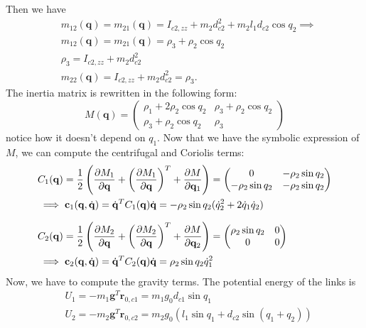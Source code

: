\documentclass[10pt, a4paper]{report}
\newcommand{\q}{{\mathbf q}}
\begin{document}
Then we have\begin{align}
    &m_{12}(\q)=m_{21}(\q)=I_{c2,zz} + m_2 d_{c2}^2 + m_2 l_1 d_{c2} \cos q_2\implies \\
    &m_{12}(\q)=m_{21}(\q)=\rho_3+\rho_2\cos q_2\\
    &\rho_3=I_{c2,zz} + m_2 d_{c2}^2\\
    &m_{22}(\q)=I_{c2,zz} + m_2 d_{c2}^2=\rho_3.
\end{align}
The inertia matrix is rewritten in the following form:\begin{equation}
    M(\q)=\begin{pmatrix}
        \rho_1 + 2\rho_2 \cos q_2&\rho_3+\rho_2\cos q_2\\ 
        \rho_3+\rho_2\cos q_2&\rho_3
    \end{pmatrix}
\end{equation}
notice how it doesn't depend on $q_1$. Now that we have the symbolic expression of $M$, we can compute the centrifugal and Coriolis terms:\begin{align}
    &C_1(\q)=\frac{1}{2}\left(
        \frac{\partial M_1}{\partial \q}+\left(
         \frac{\partial M_1}{\partial \q}
    \right)^T+ \frac{\partial M}{\partial \q_1}
    \right)=\begin{pmatrix}
        0&-\rho_2\sin q_2\\
        -\rho_2\sin q_2&-\rho_2\sin q_2
    \end{pmatrix}\\ 
    &\implies \mathbf c_1(\q,\dq)=\dq^T C_1(\q)\dq=-\rho_2\sin q_2(\dot q_2^2+2\dot q_1\dot q_2)\\[1.5ex]
    &C_2(\q)=\frac{1}{2}\left(
        \frac{\partial M_2}{\partial \q}+\left(
         \frac{\partial M_2}{\partial \q}
    \right)^T+ \frac{\partial M}{\partial \q_2}
    \right)=\begin{pmatrix}
       \rho_2\sin q_2&0\\ 0&0
    \end{pmatrix}\\ 
    &\implies \mathbf c_2(\q,\dq)=\dq^T C_2(\q)\dq=\rho_2\sin q_2\dot q_1^2
\end{align}
Now, we have to compute the gravity terms. The potential energy of the links is\begin{align}
    &U_1=-m_1\mathbf g^T\mathbf r_{0,c1}=m_1g_0d_{c1}\sin q_1\\ 
    &U_2=-m_2\mathbf g^T\mathbf r_{0,c2}=m_2g_0(l_1\sin q_1+d_{c2}\sin(q_1+q_2))
\end{align}
\end{document}
